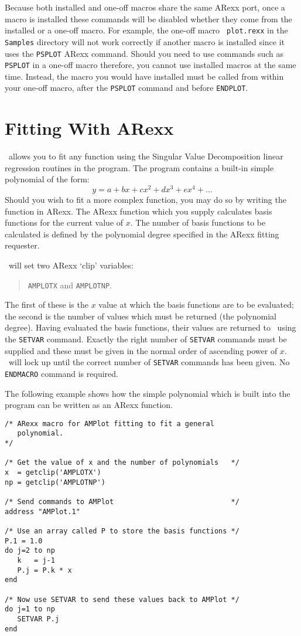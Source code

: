 Because both installed and one-off macros share the same ARexx port, once 
a macro is installed these commands will be disabled whether they come 
from the installed or a one-off macro. For example, the one-off macro {\tt
plot.rexx} in the {\tt Samples} directory will not work correctly if another 
macro is installed since it uses the {\tt PSPLOT} ARexx command. Should you need 
to use commands such as {\tt PSPLOT} in a one-off macro therefore, you cannot use 
installed macros at the same time. Instead, the macro you would have installed 
must be called from within your one-off macro, after the {\tt PSPLOT} command and 
before {\tt ENDPLOT}.

\section{Fitting With ARexx}
\amplot\ allows you to fit any function using the 
Singular Value Decomposition 
linear regression routines in the program. The program contains a built-in simple 
polynomial of the form:
$$ y = a + bx + cx^2 + dx^3 + ex^4 + \ldots $$
Should you wish to fit a more complex function, you may do so by writing the 
function in ARexx. The ARexx function which you supply calculates basis functions 
for the current value of $x$. The number of basis functions to be calculated is 
defined by the polynomial degree specified in the ARexx fitting requester.

\amplot\ will set two ARexx `clip' variables: 
\begin{quote}
{\tt AMPLOTX} and {\tt AMPLOTNP}. 
\end{quote}
The first of these is the $x$ value at which the basis functions are to be evaluated; 
the second is the number of values which must be returned (the polynomial degree).
Having evaluated the basis functions, their values are returned to \amplot\ using 
the {\tt SETVAR} command. Exactly the right number of {\tt SETVAR} commands must be 
supplied and these must be given in the normal order of ascending power of $x$.
\amplot\ will lock up until the correct number of {\tt SETVAR} commands has been 
given. No {\tt ENDMACRO} command is required.

The following example shows how the simple polynomial which is built into the 
program can be written as an ARexx function.
\newpage

\begin{verbatim}
/* ARexx macro for AMPlot fitting to fit a general
   polynomial.
*/

/* Get the value of x and the number of polynomials   */
x  = getclip('AMPLOTX')
np = getclip('AMPLOTNP')

/* Send commands to AMPlot                            */
address "AMPlot.1"

/* Use an array called P to store the basis functions */
P.1 = 1.0
do j=2 to np
   k   = j-1
   P.j = P.k * x
end

/* Now use SETVAR to send these values back to AMPlot */
do j=1 to np
   SETVAR P.j
end
\end{verbatim}
\newpage


